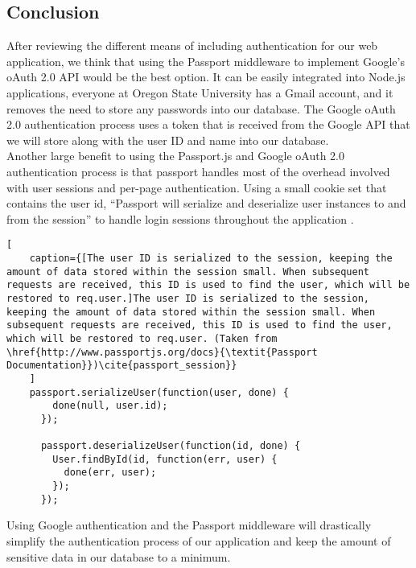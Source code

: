 \documentclass[onecolumn, draftclsnofoot,10pt, compsoc]{IEEEtran}
\begin{document}
\subsection{Conclusion}
After reviewing the different means of including authentication for our web application, we think that using the Passport middleware to implement Google's oAuth 2.0 API would be the best option. It can be easily integrated into Node.js applications, everyone at Oregon State University has a Gmail account, and it removes the need to store any passwords into our database. The Google oAuth 2.0 authentication process uses a token that is received from the Google API that we will store along with the user ID and name into our database.\\
Another large benefit to using the Passport.js and Google oAuth 2.0 authentication process is that passport handles most of the overhead involved with user sessions and per-page authentication. Using a small cookie set that contains the user id, ``Passport will serialize and deserialize user instances to and from the session'' to handle login sessions throughout the application \cite{passport_session}.
\begin{lstlisting}[
    caption={[The user ID is serialized to the session, keeping the amount of data stored within the session small. When subsequent requests are received, this ID is used to find the user, which will be restored to req.user.]The user ID is serialized to the session, keeping the amount of data stored within the session small. When subsequent requests are received, this ID is used to find the user, which will be restored to req.user. (Taken from \href{http://www.passportjs.org/docs}{\textit{Passport Documentation}})\cite{passport_session}}
    ]
    passport.serializeUser(function(user, done) {
        done(null, user.id);
      });
      
      passport.deserializeUser(function(id, done) {
        User.findById(id, function(err, user) {
          done(err, user);
        });
      });
\end{lstlisting}

Using Google authentication and the Passport middleware will drastically simplify the authentication process of our application and keep the amount of sensitive data in our database to a minimum.
\end{document}
